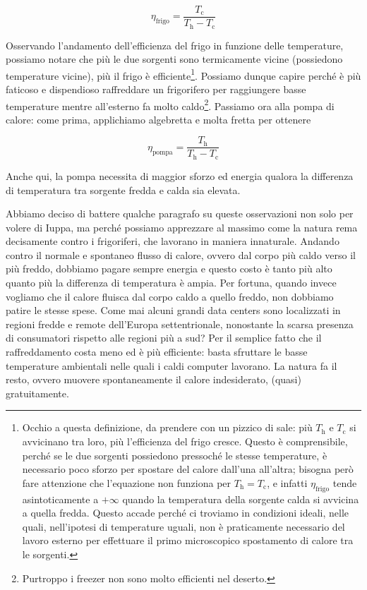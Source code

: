 \[ \eta_\text{frigo} = \frac{T_\text{c}}{T_\text{h} - T_\text{c}} \]

\noindent Osservando l'andamento dell'efficienza del frigo in funzione delle
temperature, possiamo notare che più le due sorgenti sono termicamente
vicine (possiedono temperature vicine), più il frigo è efficiente\footnote{Occhio a questa definizione, da prendere con un pizzico di
sale: più $T_\text{h}$ e $T_\text{c}$ si avvicinano tra loro, più
l'efficienza del frigo cresce. Questo è comprensibile, perché se le
due sorgenti possiedono pressoché le stesse temperature, è necessario
poco sforzo per spostare del calore dall'una all'altra; bisogna però
fare attenzione che l'equazione non funziona per $T_\text{h} = T_\text{c}$,
e infatti $\eta_\text{frigo}$ tende asintoticamente a $+\infty$ quando
la temperatura della sorgente calda si avvicina a quella fredda. Questo
accade perché ci troviamo in condizioni ideali, nelle quali, nell'ipotesi
di temperature uguali, non è praticamente necessario del lavoro esterno per effettuare
il primo microscopico spostamento di calore tra le sorgenti.}.
Possiamo dunque capire perché è più faticoso e dispendioso raffreddare
un frigorifero per raggiungere basse temperature mentre all'esterno
fa molto caldo\footnote{Purtroppo i freezer non sono molto efficienti
nel deserto.}.
Passiamo ora alla pompa di calore: come prima, applichiamo algebretta
e molta fretta per ottenere

\[ \eta_\text{pompa} = \frac{T_\text{h}}{T_\text{h} - T_\text{c}} \]

\noindent Anche qui, la pompa necessita di maggior sforzo ed energia
qualora la differenza di temperatura tra sorgente fredda e calda sia
elevata.

Abbiamo deciso di battere qualche paragrafo su queste osservazioni
non solo per volere di Iuppa, ma perché possiamo apprezzare al massimo
come la natura rema decisamente contro i frigoriferi, che lavorano
in maniera innaturale. Andando contro il normale e spontaneo flusso
di calore, ovvero dal corpo più caldo verso il più freddo, dobbiamo
pagare sempre energia e questo costo è tanto più alto quanto più
la differenza di temperatura è ampia. Per fortuna, quando invece
vogliamo che il calore fluisca dal corpo caldo a quello freddo,
non dobbiamo patire le stesse spese. Come mai alcuni grandi data
centers sono localizzati in regioni fredde e remote dell'Europa
settentrionale, nonostante la scarsa presenza di consumatori
rispetto alle regioni più a sud? Per il semplice fatto che il
raffreddamento costa meno ed è più efficiente: basta sfruttare
le basse temperature ambientali nelle quali i caldi computer
lavorano. La natura fa il resto, ovvero muovere spontaneamente
il calore indesiderato, (quasi) gratuitamente.

